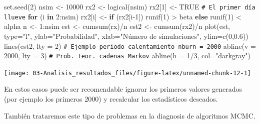 \documentclass[
]{book}
\newenvironment{Shaded}{\begin{snugshade}}{\end{snugshade}}
\newcommand{\AttributeTok}[1]{\textcolor[rgb]{0.77,0.63,0.00}{#1}}
\newcommand{\CommentTok}[1]{\textcolor[rgb]{0.56,0.35,0.01}{\textit{#1}}}
\newcommand{\ConstantTok}[1]{\textcolor[rgb]{0.00,0.00,0.00}{#1}}
\newcommand{\ControlFlowTok}[1]{\textcolor[rgb]{0.13,0.29,0.53}{\textbf{#1}}}
\newcommand{\DecValTok}[1]{\textcolor[rgb]{0.00,0.00,0.81}{#1}}
\newcommand{\FloatTok}[1]{\textcolor[rgb]{0.00,0.00,0.81}{#1}}
\newcommand{\FunctionTok}[1]{\textcolor[rgb]{0.00,0.00,0.00}{#1}}
\newcommand{\NormalTok}[1]{#1}
\newcommand{\OtherTok}[1]{\textcolor[rgb]{0.56,0.35,0.01}{#1}}
\newcommand{\SpecialCharTok}[1]{\textcolor[rgb]{0.00,0.00,0.00}{#1}}
\newcommand{\StringTok}[1]{\textcolor[rgb]{0.31,0.60,0.02}{#1}}
\theoremstyle{break}
\theoremstyle{nonumberplain}
\renewcommand{\CommentTok}[1]{\textcolor[rgb]{0.41,0.41,0.41}{\texttt{#1}}}
\begin{document}
\begin{Shaded}
\begin{Highlighting}[]
\FunctionTok{set.seed}\NormalTok{(}\DecValTok{2}\NormalTok{)}
\NormalTok{nsim }\OtherTok{\textless{}{-}} \DecValTok{10000}
\NormalTok{rx2 }\OtherTok{\textless{}{-}} \FunctionTok{logical}\NormalTok{(nsim)}
\NormalTok{rx2[}\DecValTok{1}\NormalTok{] }\OtherTok{\textless{}{-}} \ConstantTok{TRUE} \CommentTok{\# El primer día llueve}
\ControlFlowTok{for}\NormalTok{ (i }\ControlFlowTok{in} \DecValTok{2}\SpecialCharTok{:}\NormalTok{nsim)}
\NormalTok{  rx2[i] }\OtherTok{\textless{}{-}} \ControlFlowTok{if}\NormalTok{ (rx2[i}\DecValTok{{-}1}\NormalTok{]) }\FunctionTok{runif}\NormalTok{(}\DecValTok{1}\NormalTok{) }\SpecialCharTok{\textgreater{}}\NormalTok{ beta }\ControlFlowTok{else} \FunctionTok{runif}\NormalTok{(}\DecValTok{1}\NormalTok{) }\SpecialCharTok{\textless{}}\NormalTok{ alpha}
\NormalTok{n }\OtherTok{\textless{}{-}} \DecValTok{1}\SpecialCharTok{:}\NormalTok{nsim}
\NormalTok{est }\OtherTok{\textless{}{-}} \FunctionTok{cumsum}\NormalTok{(rx)}\SpecialCharTok{/}\NormalTok{n}
\NormalTok{est2 }\OtherTok{\textless{}{-}} \FunctionTok{cumsum}\NormalTok{(rx2)}\SpecialCharTok{/}\NormalTok{n}
\FunctionTok{plot}\NormalTok{(est, }\AttributeTok{type=}\StringTok{"l"}\NormalTok{, }\AttributeTok{ylab=}\StringTok{"Probabilidad"}\NormalTok{, }
     \AttributeTok{xlab=}\StringTok{"Número de simulaciones"}\NormalTok{, }\AttributeTok{ylim=}\FunctionTok{c}\NormalTok{(}\DecValTok{0}\NormalTok{,}\FloatTok{0.6}\NormalTok{))}
\FunctionTok{lines}\NormalTok{(est2, }\AttributeTok{lty =} \DecValTok{2}\NormalTok{)}
\CommentTok{\# Ejemplo periodo calentamiento nburn = 2000}
\FunctionTok{abline}\NormalTok{(}\AttributeTok{v =} \DecValTok{2000}\NormalTok{, }\AttributeTok{lty =} \DecValTok{3}\NormalTok{)}
\CommentTok{\# Prob. teor. cadenas Markov}
\FunctionTok{abline}\NormalTok{(}\AttributeTok{h =} \DecValTok{1}\SpecialCharTok{/}\DecValTok{3}\NormalTok{, }\AttributeTok{col=}\StringTok{"darkgray"}\NormalTok{)     }
\end{Highlighting}
\end{Shaded}

\begin{center}\texttt{[image: 03-Analisis\_resultados\_files/figure-latex/unnamed-chunk-12-1]} \end{center}

En estos casos puede ser recomendable ignorar los primeros valores generados (por ejemplo los primeros 2000) y recalcular los
estadísticos deseados.

También trataremos este tipo de problemas en la diagnosis de algoritmos MCMC.
\end{document}

